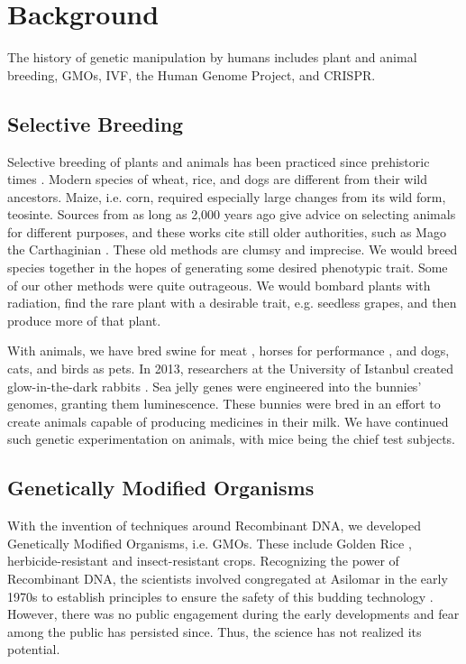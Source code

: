 \section{Background}
\label{sec:background}

The history of genetic manipulation by humans includes plant and animal breeding, GMOs, IVF, the Human Genome Project, and CRISPR.

\subsection{Selective Breeding}

Selective breeding of plants and animals has been practiced since prehistoric times \cite{Buffum1909}.
Modern species of wheat, rice, and dogs are different from their wild ancestors.
Maize, i.e. corn, required especially large changes from its wild form, teosinte.
Sources from as long as 2,000 years ago give advice on selecting animals for different purposes, and these works cite still older authorities, such as Mago the Carthaginian \cite{Lush2017}.
These old methods are clumsy and imprecise.
We would breed species together in the hopes of generating some desired phenotypic trait.
Some of our other methods were quite outrageous.
We would bombard plants with radiation, find the rare plant with a desirable trait, e.g. seedless grapes, and then produce more of that plant.

With animals, we have bred swine for meat \cite{OSU2011}, horses for performance \cite{Evans2000}, and dogs, cats, and birds as pets.
In 2013, researchers at the University of Istanbul created glow-in-the-dark rabbits \cite{Rojhan2013}.
Sea jelly genes were engineered into the bunnies' genomes, granting them luminescence.
These bunnies were bred in an effort to create animals capable of producing medicines in their milk.
We have continued such genetic experimentation on animals, with mice being the chief test subjects.

\subsection{Genetically Modified Organisms}

With the invention of techniques around Recombinant DNA, we developed Genetically Modified Organisms, i.e. GMOs.
These include Golden Rice \cite{Xudong2000}, herbicide-resistant \cite{Funke2006} and insect-resistant \cite{Paine2005} crops.
Recognizing the power of Recombinant DNA, the scientists involved congregated at Asilomar in the early 1970s to establish principles to ensure the safety of this budding technology \cite{Berg1975}.
However, there was no public engagement during the early developments and fear among the public has persisted since.
Thus, the science has not realized its potential.

